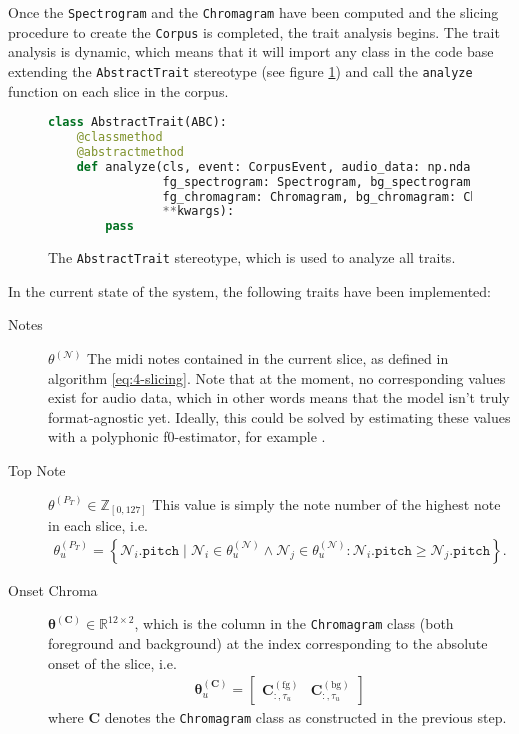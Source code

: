Once the \texttt{Spectrogram} and the \texttt{Chromagram} have been computed and the slicing procedure to create the \texttt{Corpus} is completed, the trait analysis begins. The trait analysis is dynamic, which means that it will import any class in the code base extending the \texttt{AbstractTrait} stereotype (see figure \ref{fig:3-abstract-trait-code}) and call the \texttt{analyze} function on each slice in the corpus. 

\begin{figure}[h!]
\begin{lstlisting}[language=Python]
class AbstractTrait(ABC):
    @classmethod
    @abstractmethod
    def analyze(cls, event: CorpusEvent, audio_data: np.ndarray,
                fg_spectrogram: Spectrogram, bg_spectrogram: Spectrogram, 
                fg_chromagram: Chromagram, bg_chromagram: Chromagram,
                **kwargs):
        pass
\end{lstlisting}
\caption{The \texttt{AbstractTrait} stereotype, which is used to analyze all traits.}
\label{fig:3-abstract-trait-code}
\end{figure}

In the current state of the system, the following traits have been implemented:

\begin{description}
	\item[Notes] $\theta^{(\mathcal N)}$ The midi notes contained in the current slice, as defined in algorithm \ref{eq:4-slicing}. Note that at the moment, no corresponding values exist for audio data, which in other words means that the model isn't truly format-agnostic yet. Ideally, this could be solved by estimating these values with a polyphonic f0-estimator, for example \cite{salamon_melody_2012}.
	\item[Top Note] $\theta^{(P_T)} \in \mathbb Z_{[0,127]}$ This value is simply the note number of the highest note in each slice, i.e. \begin{align}
			\theta^{(P_T)}_u = \left\lbrace \mathcal N_i \texttt{.pitch} \mid \mathcal N_i \in \theta^{(\mathcal N)}_u \wedge \mathcal N_j \in \theta^{(\mathcal N)}_u \colon \mathcal N_i\texttt{.pitch} \ge \mathcal N_j\texttt{.pitch} \right\rbrace.
		\end{align}
	\item[Onset Chroma] $\bm \theta^{(\bm C)} \in \mathbb R^{12\times 2}$, which is the column in the \texttt{Chromagram} class (both foreground and background) at the index corresponding to the absolute onset of the slice, i.e.	\begin{align}
			\bm \theta^{(\bm C)}_u = \begin{bmatrix}  
				\bm C^{(\text{fg})}_{\colon, \tau_u} 
				& \bm C^{(\text{bg})}_{\colon, \tau_u} 
			\end{bmatrix}
		\end{align}
	where $\bm C$ denotes the \texttt{Chromagram} class as constructed in the previous step.
\end{description}


